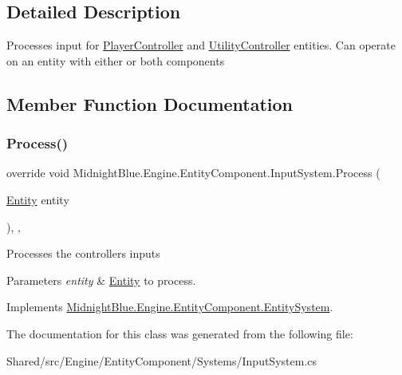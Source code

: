 \subsection{Detailed Description}
Processes input for \hyperlink{class_midnight_blue_1_1_engine_1_1_entity_component_1_1_player_controller}{Player\+Controller} and \hyperlink{class_midnight_blue_1_1_engine_1_1_entity_component_1_1_utility_controller}{Utility\+Controller} entities. Can operate on an entity with either or both components 



\subsection{Member Function Documentation}
\hypertarget{class_midnight_blue_1_1_engine_1_1_entity_component_1_1_input_system_a4aef070eb239e7328e6a61fee3e4d477}{}\label{class_midnight_blue_1_1_engine_1_1_entity_component_1_1_input_system_a4aef070eb239e7328e6a61fee3e4d477} 
\subsubsection{\texorpdfstring{Process()}{Process()}}
{\footnotesize\ttfamily override void Midnight\+Blue.\+Engine.\+Entity\+Component.\+Input\+System.\+Process (\begin{DoxyParamCaption}\item[{\hyperlink{class_midnight_blue_1_1_engine_1_1_entity_component_1_1_entity}{Entity}}]{entity }\end{DoxyParamCaption})\hspace{0.3cm}{\ttfamily [inline]}, {\ttfamily [protected]}, {\ttfamily [virtual]}}



Processes the controllers inputs 


\begin{DoxyParams}{Parameters}
{\em entity} & \hyperlink{class_midnight_blue_1_1_engine_1_1_entity_component_1_1_entity}{Entity} to process.\\
\hline
\end{DoxyParams}


Implements \hyperlink{class_midnight_blue_1_1_engine_1_1_entity_component_1_1_entity_system_a94aa715ac6bfe9a720c3d12d56c7598c}{Midnight\+Blue.\+Engine.\+Entity\+Component.\+Entity\+System}.



The documentation for this class was generated from the following file\+:\begin{DoxyCompactItemize}
\item 
Shared/src/\+Engine/\+Entity\+Component/\+Systems/Input\+System.\+cs\end{DoxyCompactItemize}
